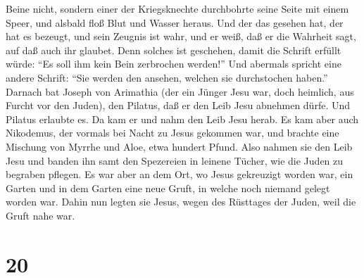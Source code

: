 Beine nicht,  sondern einer der Kriegsknechte durchbohrte
seine Seite mit einem Speer, und alsbald floß Blut und Wasser heraus.
 Und der das gesehen hat, der hat es bezeugt, und sein
Zeugnis ist wahr, und er weiß, daß er die Wahrheit sagt, auf daß auch
ihr glaubet.  Denn solches ist geschehen, damit die
Schrift erfüllt würde: ``Es soll ihm kein Bein zerbrochen werden!''
 Und abermals spricht eine andere Schrift: ``Sie werden
den ansehen, welchen sie durchstochen haben.''  Darnach
bat Joseph von Arimathia (der ein Jünger Jesu war, doch heimlich, aus
Furcht vor den Juden), den Pilatus, daß er den Leib Jesu abnehmen dürfe.
Und Pilatus erlaubte es. Da kam er und nahm den Leib Jesu herab.
 Es kam aber auch Nikodemus, der vormals bei Nacht zu
Jesus gekommen war, und brachte eine Mischung von Myrrhe und Aloe, etwa
hundert Pfund.  Also nahmen sie den Leib Jesu und banden
ihn samt den Spezereien in leinene Tücher, wie die Juden zu begraben
pflegen.  Es war aber an dem Ort, wo Jesus gekreuzigt
worden war, ein Garten und in dem Garten eine neue Gruft, in welche noch
niemand gelegt worden war.  Dahin nun legten sie Jesus,
wegen des Rüsttages der Juden, weil die Gruft nahe war.

\hypertarget{section-19}{%
\section{20}\label{section-19}}

